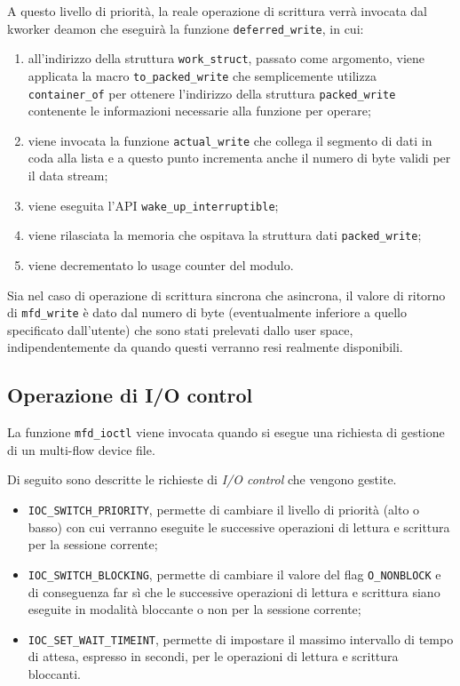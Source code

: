 \documentclass{article}
\begin{document}
A questo livello di priorità, la reale operazione di scrittura verrà invocata dal kworker deamon che eseguirà la funzione \texttt{deferred\_write}, in cui:
\begin{enumerate}
\item all'indirizzo della struttura \texttt{work\_struct}, passato come argomento, viene applicata la macro \texttt{to\_packed\_write} che semplicemente utilizza \texttt{container\_of} per ottenere l'indirizzo della struttura \texttt{packed\_write} contenente le informazioni necessarie alla funzione per operare;
\item viene invocata la funzione \texttt{actual\_write} che collega il segmento di dati in coda alla lista e a questo punto incrementa anche il numero di byte validi per il data stream;
\item viene eseguita l'API \texttt{wake\_up\_interruptible};
\item viene rilasciata la memoria che ospitava la struttura dati \texttt{packed\_write};
\item viene decrementato lo usage counter del modulo.
\end{enumerate}

Sia nel caso di operazione di scrittura sincrona che asincrona, il valore di ritorno di \texttt{mfd\_write} è dato dal numero di byte (eventualmente inferiore a quello specificato dall'utente) che sono stati prelevati dallo user space, indipendentemente da quando questi verranno resi realmente disponibili.

\subsection{Operazione di I/O control}
La funzione \texttt{mfd\_ioctl} viene invocata quando si esegue una richiesta di gestione di un multi-flow device file.

Di seguito sono descritte le richieste di \textsl{I/O control} che vengono gestite.
\begin{itemize}
\item \texttt{IOC\_SWITCH\_PRIORITY}, permette di cambiare il livello di priorità (alto o basso) con cui verranno eseguite le successive operazioni di lettura e scrittura per la sessione corrente;
\item \texttt{IOC\_SWITCH\_BLOCKING}, permette di cambiare il valore del flag \texttt{O\_NONBLOCK} e di conseguenza far sì che le successive operazioni di lettura e scrittura siano eseguite in modalità bloccante o non per la sessione corrente;
\item \texttt{IOC\_SET\_WAIT\_TIMEINT}, permette di impostare il massimo intervallo di tempo di attesa, espresso in secondi, per le operazioni di lettura e scrittura bloccanti.
\end{itemize}
\end{document}
